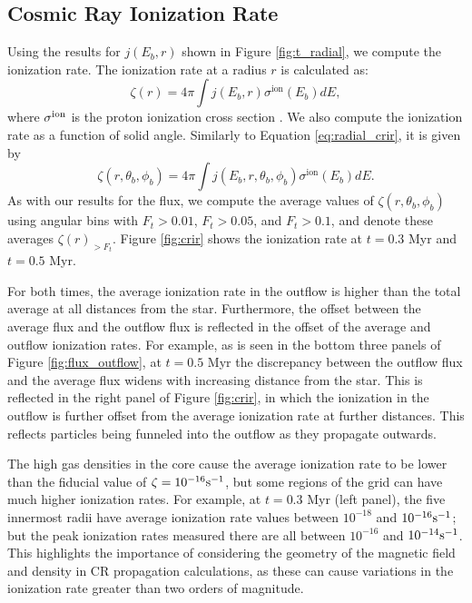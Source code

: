 \documentclass[twocolumn]{aastex63}
\def\t{\text}
\begin{document}
\subsection{Cosmic Ray Ionization Rate}
\label{subsection:crir}

Using the results for $j(E_b, r)$ shown in Figure \ref{fig:t_radial}, we compute the ionization rate. The ionization rate at a radius $r$ is calculated as:
\begin{equation}
    \label{eq:radial_crir}
    \zeta(r)=4\pi \int j(E_b,r) \sigma^{\t{ion}} (E_b) dE, 
\end{equation}
where $\sigma^{\rm ion}$ is the proton ionization cross section \citep{rudd_1985_cs, rudd_1991_cs, padovani_2009_cosmic}. We also compute the ionization rate as a function of solid angle. Similarly to Equation \ref{eq:radial_crir}, it is given by
\begin{equation}
    \label{eq:angle_crir}
    \zeta(r,\theta_b,\phi_b)= 4\pi \int j(E_b,r,\theta_b,\phi_b) \sigma^{\t{ion}} (E_b) dE.
\end{equation}
As with our results for the flux, we compute the average values of $\zeta(r,\theta_b,\phi_b)$ using angular bins with $F_t>0.01$, $F_t>0.05$, and $F_t>0.1$, and denote these averages $\zeta(r)_{>F_t}$. Figure \ref{fig:crir} shows the ionization rate at $t=0.3$ Myr and $t=0.5$ Myr.

For both times, the average ionization rate in the outflow is higher than the total average at all distances from the star. Furthermore, the offset between the average flux and the outflow flux is reflected in the offset of the average and outflow ionization rates. For example, as is seen in the bottom three panels of Figure \ref{fig:flux_outflow}, at $t=0.5$ Myr the discrepancy between the outflow flux and the average flux widens with increasing distance from the star. This is reflected in the right panel of Figure \ref{fig:crir}, in which the ionization in the outflow is further offset from the average ionization rate at further distances. This reflects particles being funneled into the outflow as they propagate outwards. 

The high gas densities in the core cause the average ionization rate to be lower than the fiducial value of $\zeta=10^{-16} \rm s^{-1}$, but some regions of the grid can have much higher ionization rates. For example, at $t=0.3$ Myr (left panel), the five innermost radii have average ionization rate values between $10^{-18}$ and $10^{-16} \rm s^{-1}$; but the peak ionization rates measured there are all between $10^{-16}$ and $10^{-14} \rm s^{-1}$. This highlights the importance of considering the geometry of the magnetic field and density in CR propagation calculations, as these can cause variations in the ionization rate greater than two orders of magnitude.
\end{document}
